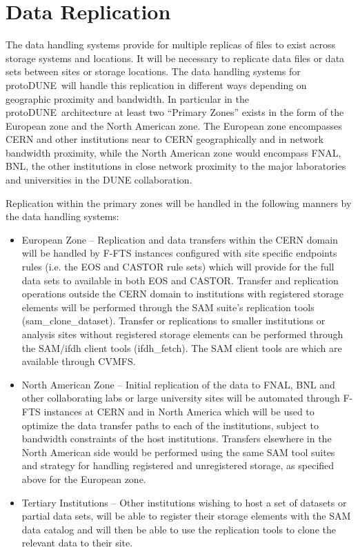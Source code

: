 \documentclass[pdftex,12pt,letter]{article}
\newcommand{\pd}{protoDUNE\ }
\begin{document}
\section{Data Replication}

The data handling systems provide for multiple replicas of files to exist across storage systems and locations.  It will be necessary to replicate data files or data sets between sites or storage locations.  The data handling systems for \pd will handle this replication in different ways depending on geographic proximity and bandwidth.  In particular in the \pd architecture at least two “Primary Zones” exists in the form of the European zone and the North American zone.  The European zone encompasses CERN and other institutions near to CERN geographically and in network bandwidth proximity, while the North American zone would encompass FNAL, BNL, the other institutions in close network proximity to the major laboratories and universities in the DUNE collaboration. 

Replication within the primary zones will be handled in the following manners by the data handling systems:

\begin{itemize}
\item European Zone -- Replication and data transfers within the CERN domain will be handled by F-FTS instances configured with site specific endpoints rules (i.e. the EOS and CASTOR rule sets) which will provide for the full data sets to available in both EOS and CASTOR.  Transfer and replication operations outside the CERN domain to institutions with registered storage elements will be performed through the SAM suite’s replication tools (sam\_clone\_dataset).  Transfer or replications to smaller institutions or analysis sites without registered storage elements can be performed through the SAM/ifdh client tools (ifdh\_fetch).  The SAM client tools are which are available through CVMFS.  

\item North American Zone -- Initial replication of the data to FNAL, BNL and other collaborating labs or large university sites will be automated through F-FTS instances at CERN and in North America which will be used to optimize the data transfer paths to each of the institutions, subject to bandwidth constraints of the host institutions.   Transfers elsewhere in the North American side would be performed using the same SAM tool suites and strategy for handling registered and unregistered storage, as specified above for the European zone. 
\item Tertiary Institutions -- Other institutions wishing to host a set of datasets or partial data sets, will be able to register their storage elements with the SAM data catalog and will then be able to use the replication tools to clone the relevant data to their site. 
\end{itemize}
\end{document}
